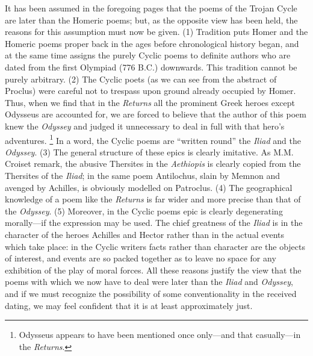 It has been assumed in the foregoing pages that the poems of the Trojan Cycle
are later than the Homeric poems; but, as the opposite view has been held, the
reasons for this assumption must now be given. (1) Tradition puts Homer and the
Homeric poems proper back in the ages before chronological history began, and
at the same time assigns the purely Cyclic poems to definite authors who are
dated from the first Olympiad (776 B.C.) downwards. This tradition cannot be
purely arbitrary. (2) The Cyclic poets (as we can see from the abstract of
Proclus) were careful not to trespass upon ground already occupied by Homer.
Thus, when we find that in the \emph{Returns} all the prominent Greek heroes
except Odysseus are accounted for, we are forced to believe that the author of
this poem knew the \emph{Odyssey} and judged it unnecessary to deal in full
with that hero’s adventures. \footnote{Odysseus appears to have
been mentioned once only—and that casually—in the
\emph{Returns}.} In a
word, the Cyclic poems are “written round” the \emph{Iliad} and the
\emph{Odyssey}. (3) The general structure of these epics is clearly imitative.
As M.M. Croiset remark, the abusive Thersites in the \emph{Aethiopis} is
clearly copied from the Thersites of the \emph{Iliad}; in the same poem
Antilochus, slain by Memnon and avenged by Achilles, is obviously modelled on
Patroclus. (4) The geographical knowledge of a poem like the \emph{Returns} is
far wider and more precise than that of the \emph{Odyssey}. (5) Moreover, in
the Cyclic poems epic is clearly degenerating morally—if the expression
may be used. The chief greatness of the \emph{Iliad} is in the character of the
heroes Achilles and Hector rather than in the actual events which take place:
in the Cyclic writers facts rather than character are the objects of interest,
and events are so packed together as to leave no space for any exhibition of
the play of moral forces. All these reasons justify the view that the poems
with which we now have to deal were later than the \emph{Iliad} and
\emph{Odyssey}, and if we must recognize the possibility of some
conventionality in the received dating, we may feel confident that it is at
least approximately just.


